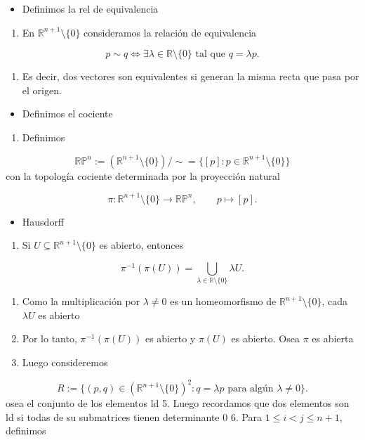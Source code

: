 \begin{bookproof}{}
\begin{itemize}
\item Definimos la rel de equivalencia
\end{itemize}
\begin{enumerate}
\item En $\mathbb{R}^{n+1}\setminus\{0\}$ consideramos la relación de equivalencia
\end{enumerate}
\[
p\sim q \iff \exists \lambda\in \mathbb{R}\setminus\{0\}\text{ tal que }q=\lambda p.
\]
\begin{enumerate}[start=2]
\item Es decir, dos vectores son equivalentes si generan la misma recta que pasa por el origen.
\end{enumerate}
\begin{itemize}
\item Definimos el cociente
\end{itemize}
\begin{enumerate}
\item Definimos
\end{enumerate}
\[
\mathbb{RP}^n:= (\mathbb{R}^{n+1}\setminus\{0\})/{\sim}= \{[p]:p\in \mathbb{R}^{n+1}\setminus\{0\}\}
\]
con la topología cociente determinada por la proyección natural

\[
\pi:\mathbb{R}^{n+1}\setminus\{0\}\longrightarrow \mathbb{RP}^n, \qquad p\longmapsto [p].
\]
\begin{itemize}
\item Hausdorff
\end{itemize}
\begin{enumerate}
\item Si $U\subseteq \mathbb{R}^{n+1}\setminus\{0\}$ es abierto, entonces
\end{enumerate}
\[
\pi^{-1}(\pi(U))= \bigcup_{\lambda\in \mathbb{R}\setminus\{0\}} \lambda U.
\]
\begin{enumerate}[start=2]
\item Como la multiplicación por $\lambda\neq 0$ es un homeomorfismo de $\mathbb{R}^{n+1}\setminus\{0\}$, cada $\lambda U$ es abierto
\item Por lo tanto, $\pi^{-1}(\pi(U))$ es abierto y $\pi(U)$ es abierto. Osea $\pi$ es abierta
\item Luego consideremos
\end{enumerate}
\[
R:=\{(p,q)\in (\mathbb{R}^{n+1}\setminus\{0\})^2:q=\lambda p \text{ para algún } \lambda\neq 0\}.
\]
osea el conjunto de los elementos ld 5. Luego recordamos que dos elementos son ld si todas de su submatrices tienen determinante 0 6. Para $1\le i<j\le n+1$, definimos


\end{bookproof}
